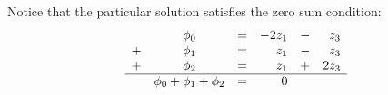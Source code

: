 Notice that the particular solution satisfies the zero sum condition:
\begin{equation}
  \begin{array}{cccrcrcccccc}
     &\phi_{0}&=&-2z_{1}&-&z_{3}\\
    +&\phi_{1}&=&z_{1}&-&z_{3}\\
    +&\phi_{2}&=&z_{1}&+&2z_{3}\\\hline
     &\phi_{0}+\phi_{1}+\phi_{2}&=&0
  \end{array}
\end{equation}


\endinput